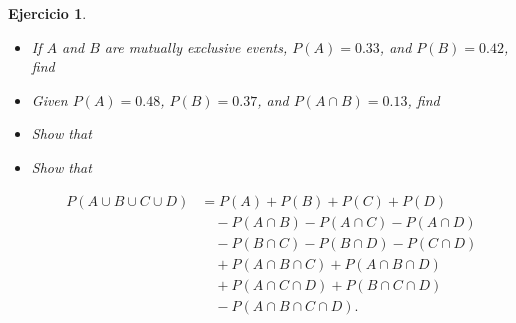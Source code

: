 \documentclass[12pt,twoside]{article}
\newtheorem{Ejer}{Ejercicio}
\begin{document}
\begin{Ejer}

\begin{itemize}
\item[a) ] If $A$ and $B$ are mutually exclusive events, $P(A)=0.33$, and $P(B)=0.42$, find

\begin{itemize}
\end{itemize}

\item[b) ] Given $P(A)=0.48$, $P(B)=0.37$, and $P(A\cap B)=0.13$, find

\begin{itemize}
\end{itemize}

\item[c) ] Show that

\begin{itemize}
\end{itemize}

\item[d) ] Show that

\begin{align*}
P(A\cup B\cup C\cup D) &= P(A)+P(B)+P(C)+P(D) \\
&\quad -P(A\cap B)-P(A\cap C)-P(A\cap D) \\
&\quad -P(B\cap C)-P(B\cap D)-P(C\cap D) \\
&\quad +P(A\cap B\cap C)+P(A\cap B\cap D) \\
&\quad +P(A\cap C\cap D)+P(B\cap C\cap D) \\
&\quad -P(A\cap B\cap C\cap D).
\end{align*}

\end{itemize}
\end{Ejer}
\end{document}

